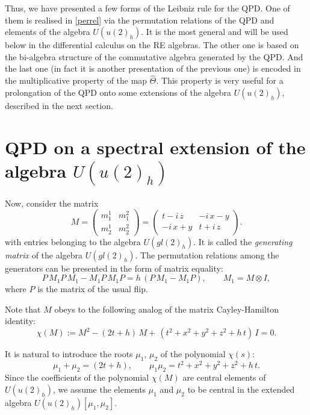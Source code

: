 \documentclass[10pt,a4paper]{amsart}
\newcommand{\ot}{\otimes}
\newcommand{\hatt}{\widehat{\Theta}}
\numberwithin{equation}{section}
\begin{document}
Thus, we have presented a few forms of the Leibniz rule for the QPD. One of them is realised in \eqref{perrel} via the permutation relations of
the QPD and elements of the algebra $U(u(2)_h)$. It is the most general and will be used below in the differential calculus on the RE algebras. 
The other one is based on the bi-algebra structure of the commutative algebra generated by the QPD. And the last one (in fact it is another presentation of the previous one) 
is encoded in the multiplicative property of the map $\hatt$. This
property is very useful for a prolongation of the QPD onto some extensions of the algebra $U(u(2)_h)$, described in the next section.

\section[QPD on a spectral extension of U(u(2)h)]{QPD on a spectral extension of the algebra $U(u(2)_h)$}\label{sec:spectral}

Now, consider the matrix
\begin{equation}
M=\left(\begin{array}{cc}
	m_1^1& m_1^2\\
	m_2^1& m_2^2
\end{array}\right)=\left(\begin{array}{cc}
	t-i\,z& -i\, x-y\\
	-i\, x+y& t+i\, z
\end{array}\right).
\label{matrN}
\end{equation}
with entries belonging to the algebra $U(gl(2)_h)$. It is called the \emph{generating matrix} of the algebra $U(gl(2)_h)$.
The permutation relations among the generators can be presented in the form of matrix equality:
\[
P\,M_1P\,M_1-M_1P\,M_1P=h\,(P\, M_1-M_1 P), \qquad M_1=M\ot I,
\]
where $P$ is the matrix of the usual flip.

Note that $M$ obeys to the following analog of the matrix Cayley-Hamilton identity:
\begin{equation}
\chi(M) := M^2-(2t+h)\, M+\,(t^2+x^2+y^2+z^2+h\, t)\,I= 0.
\label{CH}
\end{equation}

It is natural to introduce the roots $\mu_1,\, \mu_2$ of the polynomial $\chi(s)$:
\[
\mu_1+\mu_2=(2t+h),\qquad \mu_1 \mu_2=t^2+x^2+y^2+z^2+h\, t.
\]
Since the coefficients of the polynomial $\chi(M)$ are central elements of $U(u(2)_h)$, we assume the elements $\mu_1$ and
$\mu_2$ to be central in the extended algebra $U(u(2)_h)[\mu_1,\mu_2]$.
\end{document}
